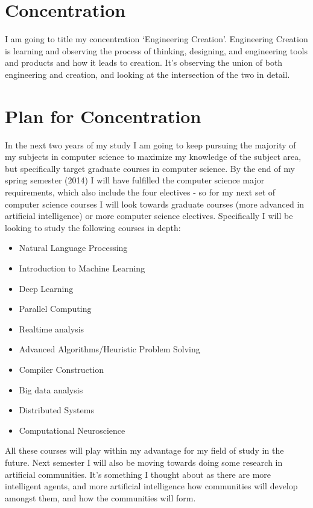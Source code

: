 \documentclass[11pt, oneside]{article}
\begin{document}
\section{Concentration}

\par I am going to title my concentration `Engineering Creation'. Engineering Creation is learning and observing the process of thinking, designing, and engineering tools and products and how it leads to creation. It's observing the union of both engineering and creation, and looking at the intersection of the two in detail.

\section{Plan for Concentration}

\par In the next two years of my study I am going to keep pursuing the majority of my subjects in computer science to maximize my knowledge of the subject area, but specifically target graduate courses in computer science. By the end of my spring semester (2014) I will have fulfilled the computer science major requirements, which also include the four electives - so for my next set of computer science courses I will look towards graduate courses (more advanced in artificial intelligence) or more computer science electives. Specifically I will be looking to study the following courses in depth:

\begin{itemize}
\item Natural Language Processing
\item Introduction to Machine Learning
\item Deep Learning
\item Parallel Computing
\item Realtime analysis
\item Advanced Algorithms/Heuristic Problem Solving 
\item Compiler Construction
\item Big data analysis
\item Distributed Systems
\item Computational Neuroscience
\end{itemize}

\par All these courses will play within my advantage for my field of study in the future. Next semester I will also be moving towards doing some research in artificial communities. It's something I thought about as there are more intelligent agents, and more artificial intelligence how communities will develop amongst them, and how the communities will form.
\end{document}
